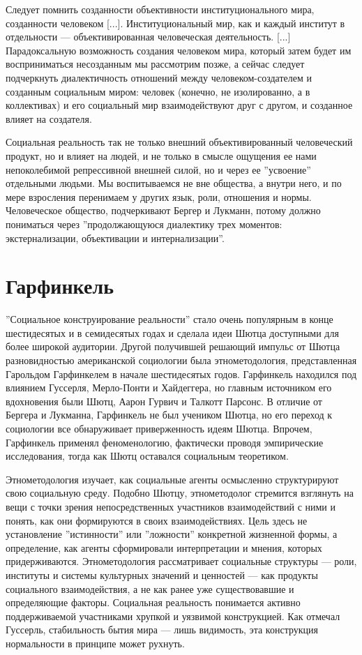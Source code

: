 \documentclass[11pt]{book}
\begin{document}
\smallskip
{}\relax
{}\relax

Следует помнить созданности объективности институционального мира, созданности человеком [...]. Институциональный мир, как и каждый институт в отдельности --- объективированная человеческая деятельность. [...] Парадоксальную возможность создания человеком мира, который затем будет им восприниматься несозданным мы рассмотрим позже, а сейчас следует подчеркнуть диалектичность отношений между человеком-создателем и созданным социальным миром: человек (конечно, не изолированно, а в коллективах) и его социальный мир взаимодействуют друг с другом, и созданное влияет на создателя.

\relax
{}\relax
\smallskip

Социальная реальность так не только внешний объективированный человеческий продукт, но и влияет на людей, и не только в смысле ощущения ее нами непоколебимой репрессивной внешней силой, но и через ее ''усвоение'' отдельными людьми. Мы воспитываемся не вне общества, а внутри него, и по мере взросления перенимаем у других язык, роли, отношения и нормы. Человеческое общество, подчеркивают Бергер и Лукманн, потому должно пониматься через ''продолжающуюся диалектику трех моментов: экстернализации, объективации и интернализации''.

\section{Гарфинкель}

''Социальное конструирование реальности'' стало очень популярным в конце шестидесятых и в семидесятых годах и сделала идеи Шютца доступными для более широкой аудитории. Другой получившей решающий импульс от Шютца разновидностью американской социологии была этнометодология, представленная Гарольдом Гарфинкелем в начале шестидесятых годов. Гарфинкель находился под влиянием Гуссерля, Мерло-Понти и Хайдеггера, но главным источником его вдохновения были Шютц, Аарон Гурвич и Талкотт Парсонс. В отличие от Бергера и Лукманна, Гарфинкель не был учеником Шютца, но его переход к социологии все обнаруживает приверженность идеям Шютца. Впрочем, Гарфинкель применял феноменологию, фактически проводя эмпирические исследования, тогда как Шютц оставался социальным теоретиком.

Этнометодология изучает, как социальные агенты осмысленно структурируют свою социальную среду. Подобно Шютцу, этнометодолог стремится взглянуть на вещи с точки зрения непосредственных участников взаимодействий с ними и понять, как они формируются в своих взаимодействиях. Цель здесь не установление ''истинности'' или ''ложности'' конкретной жизненной формы, а определение, как агенты сформировали интерпретации и мнения, которых придерживаются. Этнометодология рассматривает социальные структуры --- роли, институты и системы культурных значений и ценностей --- как продукты социального взаимодействия, а не как ранее уже существовавшие и определяющие факторы. Социальная реальность понимается активно поддерживаемой участниками хрупкой и уязвимой конструкцией. Как отмечал Гуссерль, стабильность бытия мира --- лишь видимость, эта конструкция нормальности в принципе может рухнуть.
\end{document}
